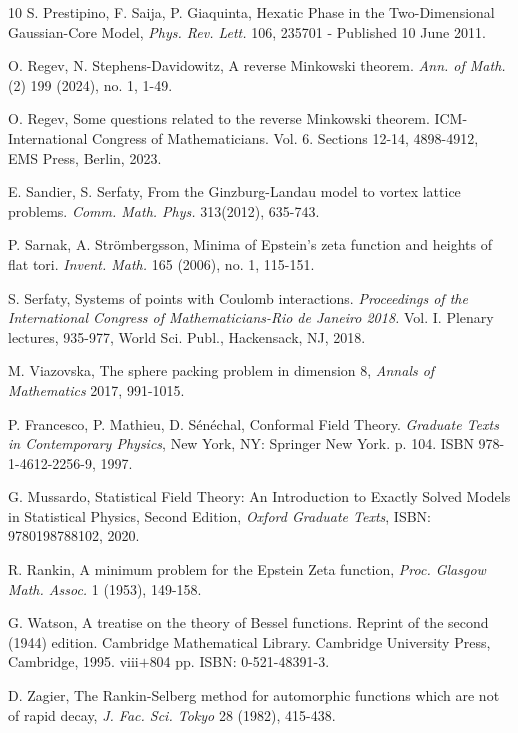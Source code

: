 \documentclass[reqno,english]{amsart}
\newtheorem{open problem}{Open Problem}[section]
\newtheorem{open question}{Open Question}[section]
\newtheorem{open questions on hexagonal lattice}{Open Questions on hexagonal lattice}[section]
\begin{document}
\begin{thebibliography}{10}
 S. Prestipino, F. Saija, P. Giaquinta,
Hexatic Phase in the Two-Dimensional Gaussian-Core Model,
{\em Phys. Rev. Lett.} 106, 235701 - Published 10 June 2011.


 O. Regev, N. Stephens-Davidowitz, A reverse Minkowski theorem. {\em Ann. of Math.} (2) 199 (2024), no. 1, 1-49.

O. Regev, Some questions related to the reverse Minkowski theorem. ICM-International Congress of Mathematicians. Vol. 6. Sections 12-14, 4898-4912, EMS Press, Berlin, 2023.

E. Sandier, S. Serfaty, From the Ginzburg-Landau model to vortex lattice problems. {\em Comm. Math. Phys.} 313(2012), 635-743.

P. Sarnak, A. Str\"{o}mbergsson, Minima of Epstein's zeta function and heights of flat tori. {\em Invent. Math.} 165 (2006), no. 1, 115-151.

S. Serfaty, Systems of points with Coulomb interactions. {\em Proceedings of the International Congress of Mathematicians-Rio de Janeiro 2018.} Vol. I. Plenary lectures, 935-977, World Sci. Publ., Hackensack, NJ, 2018.

 M. Viazovska, The sphere packing problem in dimension 8, {\em Annals of Mathematics} 2017, 991-1015.

P. Francesco, P. Mathieu, D. S\'en\'echal, Conformal Field Theory. {\it Graduate Texts in Contemporary Physics}, New York, NY: Springer New York. p. 104. ISBN 978-1-4612-2256-9, 1997.


 G. Mussardo,
Statistical Field Theory:
An Introduction to Exactly Solved Models in Statistical Physics,
Second Edition, {\it Oxford Graduate Texts}, ISBN: 9780198788102, 2020.

 R. Rankin, A minimum problem for the Epstein Zeta function, {\em Proc. Glasgow Math.
Assoc.} 1 (1953), 149-158.

G. Watson, A treatise on the theory of Bessel functions. Reprint of the second (1944) edition. Cambridge Mathematical Library. Cambridge University Press, Cambridge, 1995. viii$+$804 pp. ISBN: 0-521-48391-3.

 D. Zagier,
The Rankin-Selberg method for automorphic functions which are not of rapid decay,
{\em J. Fac. Sci. Tokyo} 28 (1982), 415-438.

\end{thebibliography}
\end{document}
